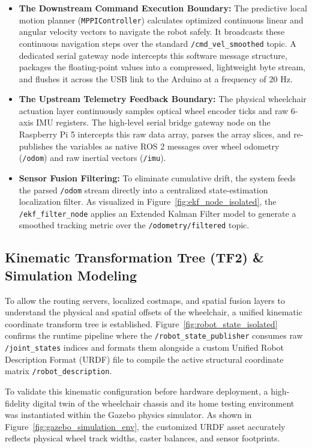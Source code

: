 \documentclass[12pt,a4paper]{report}
\begin{document}
\begin{itemize}[leftmargin=*,itemsep=2pt]
    \item \textbf{The Downstream Command Execution Boundary:} The predictive local motion planner (\texttt{MPPIController}) calculates optimized continuous linear and angular velocity vectors to navigate the robot safely. It broadcasts these continuous navigation steps over the standard \texttt{/cmd\_vel\_smoothed} topic. A dedicated serial gateway node intercepts this software message structure, packages the floating-point values into a compressed, lightweight byte stream, and flushes it across the USB link to the Arduino at a frequency of $20\text{ Hz}$.
    \item \textbf{The Upstream Telemetry Feedback Boundary:} The physical wheelchair actuation layer continuously samples optical wheel encoder ticks and raw 6-axis IMU registers. The high-level serial bridge gateway node on the Raspberry Pi 5 intercepts this raw data array, parses the array slices, and re-publishes the variables as native ROS 2 messages over wheel odometry (\texttt{/odom}) and raw inertial vectors (\texttt{/imu}). 
    \item \textbf{Sensor Fusion Filtering:} To eliminate cumulative drift, the system feeds the parsed \texttt{/odom} stream directly into a centralized state-estimation localization filter. As visualized in Figure~\ref{fig:ekf_node_isolated}, the \texttt{/ekf\_filter\_node} applies an Extended Kalman Filter model to generate a smoothed tracking metric over the \texttt{/odometry/filtered} topic.
\end{itemize}


\subsection{Kinematic Transformation Tree (TF2) \& Simulation Modeling}
To allow the routing servers, localized costmaps, and spatial fusion layers to understand the physical and spatial offsets of the wheelchair, a unified kinematic coordinate transform tree is established. Figure~\ref{fig:robot_state_isolated} confirms the runtime pipeline where the \texttt{/robot\_state\_publisher} consumes raw \texttt{/joint\_states} indices and formats them alongside a custom Unified Robot Description Format (URDF) file to compile the active structural coordinate matrix \texttt{/robot\_description}.

To validate this kinematic configuration before hardware deployment, a high-fidelity digital twin of the wheelchair chassis and its home testing environment was instantiated within the Gazebo physics simulator. As shown in Figure~\ref{fig:gazebo_simulation_env}, the customized URDF asset accurately reflects physical wheel track widths, caster balances, and sensor footprints.
\end{document}
